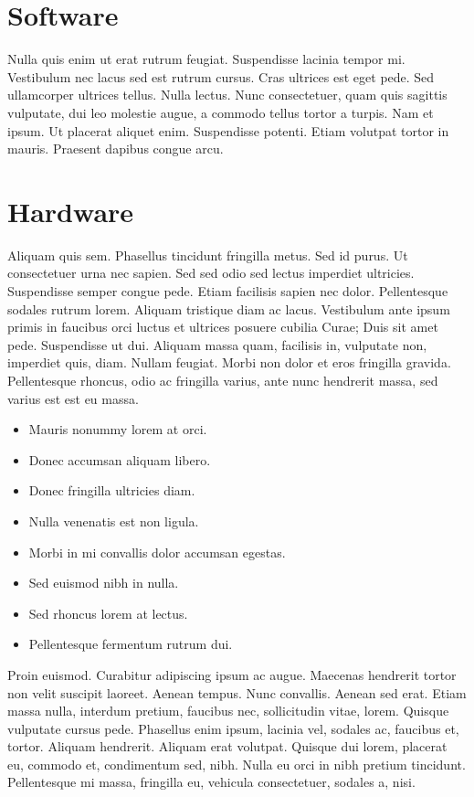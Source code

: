 \documentclass[printmode]{mgr}
\begin{document}
\section{Software}
Nulla quis enim ut erat rutrum feugiat. Suspendisse lacinia tempor
mi. Vestibulum nec lacus sed est rutrum cursus. Cras ultrices est eget
pede. Sed ullamcorper ultrices tellus. Nulla lectus. Nunc
consectetuer, quam quis sagittis vulputate, dui leo molestie augue, a
commodo tellus tortor a turpis. Nam et ipsum. Ut placerat aliquet
enim. Suspendisse potenti. Etiam volutpat tortor in mauris. Praesent
dapibus congue arcu.

\section{Hardware}
Aliquam quis sem. Phasellus tincidunt fringilla metus. Sed id
purus. Ut consectetuer urna nec sapien. Sed sed odio sed lectus
imperdiet ultricies. Suspendisse semper congue pede. Etiam facilisis
sapien nec dolor. Pellentesque sodales rutrum lorem. Aliquam tristique
diam ac lacus. Vestibulum ante ipsum primis in faucibus orci luctus et
ultrices posuere cubilia Curae; Duis sit amet pede. Suspendisse ut
dui. Aliquam massa quam, facilisis in, vulputate non, imperdiet quis,
diam. Nullam feugiat. Morbi non dolor et eros fringilla
gravida. Pellentesque rhoncus, odio ac fringilla varius, ante nunc
hendrerit massa, sed varius est est eu massa.


\begin{itemize}
\item Mauris nonummy lorem at orci.
\item Donec accumsan aliquam libero.
\item Donec fringilla ultricies diam.
\item Nulla venenatis est non ligula.
\item Morbi in mi convallis dolor accumsan egestas.
\item Sed euismod nibh in nulla.
\item Sed rhoncus lorem at lectus.
\item Pellentesque fermentum rutrum dui.
\end{itemize}

Proin euismod. Curabitur adipiscing ipsum ac augue. Maecenas hendrerit
tortor non velit suscipit laoreet. Aenean tempus. Nunc
convallis. Aenean sed erat. Etiam massa nulla, interdum pretium,
faucibus nec, sollicitudin vitae, lorem. Quisque vulputate cursus
pede. Phasellus enim ipsum, lacinia vel, sodales ac, faucibus et,
tortor. Aliquam hendrerit. Aliquam erat volutpat. Quisque dui lorem,
placerat eu, commodo et, condimentum sed, nibh. Nulla eu orci in nibh
pretium tincidunt. Pellentesque mi massa, fringilla eu, vehicula
consectetuer, sodales a, nisi.
\end{document}

